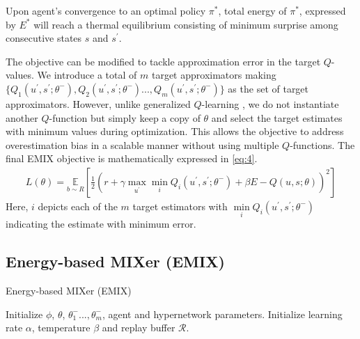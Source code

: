 \documentclass{article}
\begin{document}
\begin{multicols}{2}
\begin{customthm}{2}\label{two}
Upon agent's convergence to an optimal policy $\pi^{*}$, total energy of $\pi^{*}$, expressed by $E^{*}$ will reach a thermal equilibrium consisting of minimum surprise among consecutive states $s$ and $s^{'}$.
\end{customthm}
The objective can be modified to tackle approximation error in the target $Q$-values. We introduce a total of $m$ target approximators making $\{Q_{1}(u^{'},s^{'};\theta^{-}),Q_{2}(u^{'},s^{'};\theta^{-})...,Q_{m}(u^{'},s^{'};\theta^{-})\}$ as the set of target approximators. However, unlike generalized $Q$-learning \cite{maxmin}, we do not instantiate another $Q$-function but simply keep a copy of $\theta$ and select the target estimates with minimum values during optimization. This allows the objective to address overestimation bias in a scalable manner without using multiple $Q$-functions. The final EMIX objective is mathematically expressed in \autoref{eq:4}.
\begin{gather}
    L(\theta) = \underset{b \sim R}{\mathbb{E}}[\frac{1}{2}(r + \gamma \underset{u^{'}}{\max}\underset{i}{\min}Q_{i}(u^{'},s^{'};\theta^{-}) + \beta E - Q(u,s;\theta))^{2}] \label{eq:4}
\end{gather}
Here, $i$ depicts each of the $m$ target estimators with $\underset{i}{\min}Q_{i}(u^{'},s^{'};\theta^{-})$ indicating the estimate with minimum error. 

\subsection{Energy-based MIXer (EMIX)}
\begin{algorithm}[H]
\caption{Energy-based MIXer (EMIX)}
\label{alg:algorithm1}
\begin{algorithmic}[1]

  \State Initialize $\phi$, $\theta$, $\theta_{1}^{-}...,\theta_{m}^{-}$, agent and hypernetwork parameters.
  \State Initialize learning rate $\alpha$, temperature $\beta$ and replay buffer $\mathcal{R}$.


\end{algorithmic}
\end{algorithm}
\end{multicols}
\end{document}
